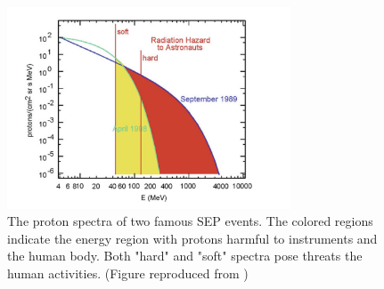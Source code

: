 \begin{figure}
	\centering
	\includegraphics[width = 0.75\textwidth]{images/SEP-radiation_hazard.png}
	\caption[The proton spectra in two \ac{SEP} events indicating the possible radiation energy]{The proton spectra of two famous \ac{SEP} events. The colored regions indicate the energy region with protons harmful to instruments and the human body. Both "hard" and "soft" spectra pose threats the human activities. (Figure reproduced from \citep{Reames2021LNP})}
	\label{Fig:SEP-radiation_hazard}
\end{figure}






